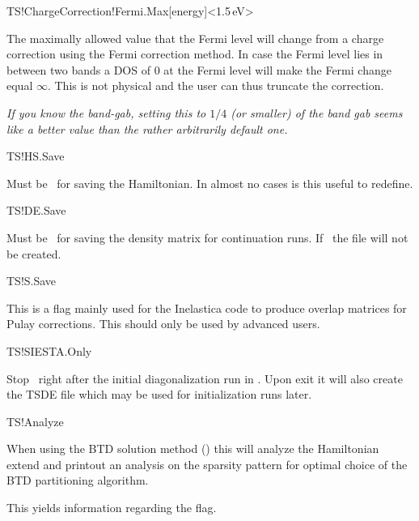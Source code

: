 \begin{fdfentry}{TS!ChargeCorrection!Fermi.Max}[energy]<1.5\,eV>%

  The maximally allowed value that the Fermi level will change from a
  charge correction using the Fermi correction method. In case the
  Fermi level lies in between two bands a DOS of $0$ at the Fermi
  level will make the Fermi change equal $\infty$. This is not
  physical and the user can thus truncate the correction.
  
  \emph{If you know the band-gab, setting this to $1/4$ (or smaller)
      of the band gab seems like a better value than the rather
      arbitrarily default one.}

\end{fdfentry}

\begin{fdflogicalT}{TS!HS.Save}

  Must be \fdftrue\ for saving the Hamiltonian. In almost no cases
  is this useful to redefine.

\end{fdflogicalT}  

\begin{fdflogicalT}{TS!DE.Save}

  Must be \fdftrue\ for saving the density matrix for continuation
  runs. If \fdffalse\ the  file will not be created.

\end{fdflogicalT}  

\begin{fdflogicalF}{TS!S.Save}

  This is a flag mainly used for the Inelastica code to produce
  overlap matrices for Pulay corrections. This should only be used by
  advanced users.

\end{fdflogicalF}


\begin{fdflogicalF}{TS!SIESTA.Only}

  Stop \tsiesta\ right after the initial diagonalization run in
  \siesta. Upon exit it will also create the TSDE file which may be
  used for initialization runs later.

\end{fdflogicalF}


\begin{fdflogicalF}{TS!Analyze}

  When using the BTD solution method () this
  will analyze the Hamiltonian extend and printout an analysis on the
  sparsity pattern for optimal choice of the BTD partitioning
  algorithm. 

  This yields information regarding the  flag.

\end{fdflogicalF}

